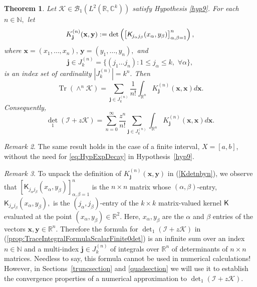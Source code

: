 \documentclass{birkjour}
\newtheorem{thm}{Theorem}[section]
\theoremstyle{definition}
\theoremstyle{remark}
\newtheorem{rem}[thm]{Remark}
\numberwithin{equation}{section}
\newcommand{\cB}{{\mathcal B}}
\begin{document}
\begin{thm}\label{prop:TraceIntegralFormulaScalarFinite0}
Let $\mathcal{K} \in \cB_1(L^2(\mathbb{R}, \mathbb{C}^k))$ satisfy Hypothesis \ref{hyp9}. For each $n \in \mathbb{N},$ let 
\begin{equation}\label{Kdetnbyn}
    {K}_{\mathbf{j}}^{(n)}(\mathbf{x}, \mathbf{y}) := \det \left( \left[ \emph{\textsf{K}}_{j_{\alpha}j_{\beta}}(x_{\alpha}, y_{\beta}) \right]_{\alpha, \beta = 1}^n \right),
\end{equation}
where $\mathbf{x} = (x_1, \dots, x_n), \, \mathbf{y} = (y_1, \dots, y_n),$ and 
\begin{equation}\nonumber
    \mathbf{j} \in J_k^{(n)} = \{ (j_1 \dots j_n) : 1 \leq j_{\alpha} \leq k, \,\, \forall \alpha \},
\end{equation}
is an index set of cardinality  $|J_k^{(n)}| = k^n.$ Then
\begin{equation}\label{prop:TraceIntegralFormulaScalarFinite0tr}
    \operatorname{Tr}({\wedge}^n \mathcal{K}) = \sum_{\mathbf{j} \in J_k^{(n)}} \frac{1}{n!} \int_{\mathbb{R}^n} {K}_{\mathbf{j}}^{(n)}(\mathbf{x}, \mathbf{x}) d\mathbf{x}.
\end{equation}
Consequently, 
\begin{equation}\label{prop:TraceIntegralFormulaScalarFinite0det}
    {\det}_1(\mathcal{I} + z\mathcal{K}) = \sum_{n=0}^{\infty} \frac{z^n}{n!} \sum_{\mathbf{j} \in J_k^{(n)}} \int_{\mathbb{R}^n} {K}_{\mathbf{j}}^{(n)}(\mathbf{x}, \mathbf{x}) d\mathbf{x}.
\end{equation}
\end{thm}

\begin{rem}
The same result holds in the case of a finite interval, $X=[a,b]$, without the
need for \eqref{eq:HypExpDecay} in Hypothesis~\ref{hyp9}.
\end{rem}


\begin{rem}
    To unpack the definition of $K_{\mathbf{j}}^{(n)}(\mathbf{x},\mathbf{y})$ in (\ref{Kdetnbyn}), we observe that $[\textsf{K}_{j_{\alpha} j_{\beta}}(x_{\alpha},y_{\beta})]_{\alpha, \beta = 1}^n $ is the $n \times n$ matrix whose $(\alpha, \beta)$-entry, $\textsf{K}_{j_{\alpha} j_{\beta}}(x_{\alpha},y_{\beta}),$ is the $(j_{\alpha},j_{\beta})$-entry of the $k \times k$ matrix-valued kernel $\textsf K$ evaluated at the point $(x_{\alpha},y_{\beta}) \in \mathbb{R}^2.$ Here, $x_{\alpha}, y_{\beta}$ are the $\alpha$ and $\beta$ entries of the vectors $\mathbf{x}, \mathbf{y} \in \mathbb{R}^n.$ Therefore the formula for ${\det}_1(\mathcal{I} + z\mathcal{K})$ in (\ref{prop:TraceIntegralFormulaScalarFinite0det}) is  an infinite sum over an index $n \in \mathbb{N}$ and a multi-index $\mathbf{j} \in J^{(n)}_k$ of integrals over $\mathbb{R}^n$ of determinants of $n \times n$ matrices.  Needless to say, this formula cannot be used in numerical calculations! However, in Sections~\ref{truncsection} and \ref{quadsection} we will use it to  establish the
 convergence properties of a numerical approximation to 
 ${\det}_1(\mathcal{I} + z\mathcal{K})$. 
\end{rem}
\end{document}
